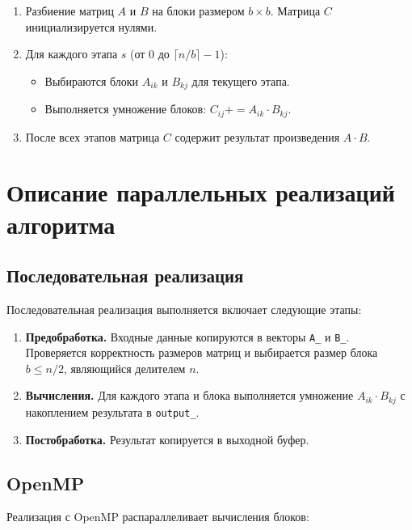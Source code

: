 \documentclass[12pt]{article}
\begin{document}
\begin{enumerate}
    \item Разбиение матриц $A$ и $B$ на блоки размером $b \times b$. Матрица $C$ инициализируется нулями.
    \item Для каждого этапа $s$ (от 0 до $\lceil n/b \rceil - 1$):
    \begin{itemize}
        \item Выбираются блоки $A_{ik}$ и $B_{kj}$ для текущего этапа.
        \item Выполняется умножение блоков: $C_{ij} += A_{ik} \cdot B_{kj}$.
    \end{itemize}
    \item После всех этапов матрица $C$ содержит результат произведения $A \cdot B$.
\end{enumerate}

\section{Описание параллельных реализаций алгоритма}

\subsection{Последовательная реализация}

Последовательная реализация выполняется включает следующие этапы:

\begin{enumerate}
    \item \textbf{Предобработка.} Входные данные копируются в векторы \texttt{A\_} и \texttt{B\_}. Проверяется корректность размеров матриц и выбирается размер блока $b \leq n/2$, являющийся делителем $n$.
    \item \textbf{Вычисления.} Для каждого этапа и блока выполняется умножение $A_{ik} \cdot B_{kj}$ с накоплением результата в \texttt{output\_}.
    \item \textbf{Постобработка.} Результат копируется в выходной буфер.
\end{enumerate}

\subsection{OpenMP}

Реализация с OpenMP распараллеливает вычисления блоков:
\end{document}
